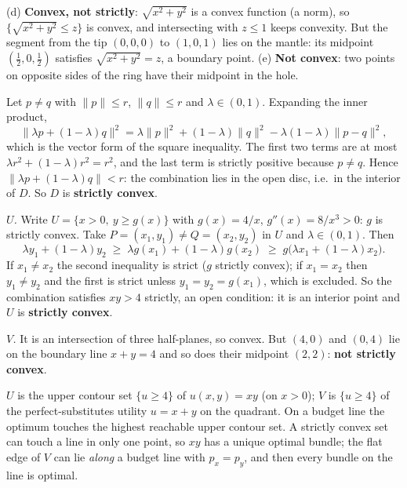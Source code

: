 \begin{solutions}
        (d) \textbf{Convex, not strictly}: $\sqrt{x^{2}+y^{2}}$ is a convex
        function (a norm), so $\{\sqrt{x^{2}+y^{2}}\le z\}$ is convex, and
        intersecting with $z\le1$ keeps convexity. But the segment from the
        tip $(0,0,0)$ to $(1,0,1)$ lies on the mantle: its midpoint
        $(\tfrac12,0,\tfrac12)$ satisfies $\sqrt{x^{2}+y^{2}}=z$, a boundary
        point.
        (e) \textbf{Not convex}: two points on opposite sides of the ring
        have their midpoint in the hole.
  \item Let $p\neq q$ with $\|p\|\le r$, $\|q\|\le r$ and
        $\lambda\in(0,1)$. Expanding the inner product,
        \[
          \|\lambda p+(1-\lambda)q\|^{2}
          =\lambda\|p\|^{2}+(1-\lambda)\|q\|^{2}
           -\lambda(1-\lambda)\|p-q\|^{2},
        \]
        which is the vector form of the square inequality. The first two
        terms are at most $\lambda r^{2}+(1-\lambda)r^{2}=r^{2}$, and the
        last term is strictly positive because $p\neq q$. Hence
        $\|\lambda p+(1-\lambda)q\|<r$: the combination lies in the open
        disc, i.e.\ in the interior of $D$. So $D$ is \textbf{strictly
        convex}.
  \item \emph{$U$.} Write $U=\{x>0,\ y\ge g(x)\}$ with $g(x)=4/x$,
        $g''(x)=8/x^{3}>0$: $g$ is strictly convex. Take
        $P=(x_1,y_1)\neq Q=(x_2,y_2)$ in $U$ and $\lambda\in(0,1)$. Then
        \[
          \lambda y_1+(1-\lambda)y_2
          \;\ge\;\lambda g(x_1)+(1-\lambda)g(x_2)
          \;\ge\; g\bigl(\lambda x_1+(1-\lambda)x_2\bigr).
        \]
        If $x_1\neq x_2$ the second inequality is strict ($g$ strictly
        convex); if $x_1=x_2$ then $y_1\neq y_2$ and the first is strict
        unless $y_1=y_2=g(x_1)$, which is excluded. So the combination
        satisfies $xy>4$ strictly, an open condition: it is an interior
        point and $U$ is \textbf{strictly convex}.

        \emph{$V$.} It is an intersection of three half-planes, so convex.
        But $(4,0)$ and $(0,4)$ lie on the boundary line $x+y=4$ and so does
        their midpoint $(2,2)$: \textbf{not strictly convex}.

        $U$ is the upper contour set $\{u\ge4\}$ of $u(x,y)=xy$ (on $x>0$);
        $V$ is $\{u\ge4\}$ of the perfect-substitutes utility $u=x+y$ on
        the quadrant. On a budget line the optimum touches the highest
        reachable upper contour set. A strictly convex set can touch a line
        in only one point, so $xy$ has a unique optimal bundle; the flat
        edge of $V$ can lie \emph{along} a budget line with $p_x=p_y$, and
        then every bundle on the line is optimal.
\end{solutions}
